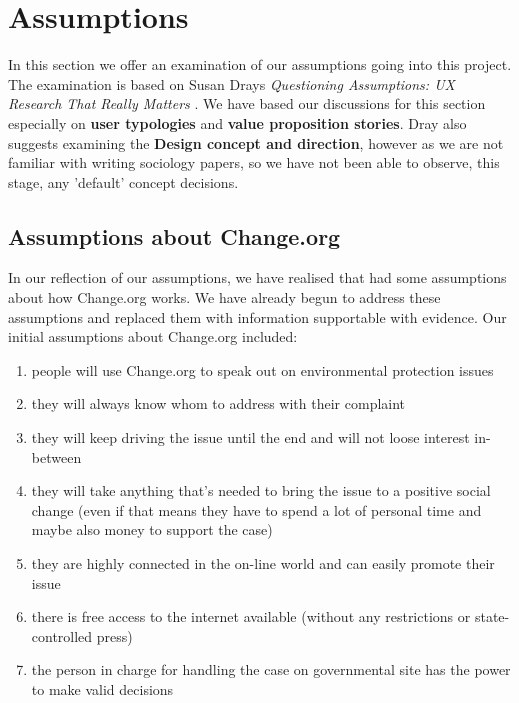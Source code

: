 \appendix
\section{Assumptions}
\label{sec:assumptions}

In this section we offer an examination of our assumptions going into this project. The examination is based on Susan Drays \textit{Questioning Assumptions: UX Research That Really Matters} \citep{dray2014questioning}. We have based our discussions for this section especially on \textbf{user typologies} and \textbf{value proposition stories}. Dray also suggests examining the \textbf{Design concept and direction}, however as we are not familiar with writing sociology papers, so we have not been able to observe, this stage, any 'default' concept decisions.

\subsection{Assumptions about Change.org}
\label{subsec:keyrequirements}
In our reflection of our assumptions, we have realised that had some assumptions about how Change.org works. We have already begun to address these assumptions and replaced them with information supportable with evidence. Our initial assumptions about Change.org included:
\begin{enumerate}
	
    \item people will use Change.org to speak out on environmental protection issues
    \item they will always know whom to address with their complaint
    \item they will keep driving the issue until the end and will not loose interest in-between
    \item they will take anything that’s needed to bring the issue to a positive social change (even if that means they have to spend a lot of personal time and maybe also money to support the case)
    \item they are highly connected in the on-line world and can easily promote their issue
    \item there is free access to the internet available (without any restrictions or state-controlled press)
    \item the person in charge for handling the case on governmental site has the power to make valid decisions
    
\end{enumerate}

